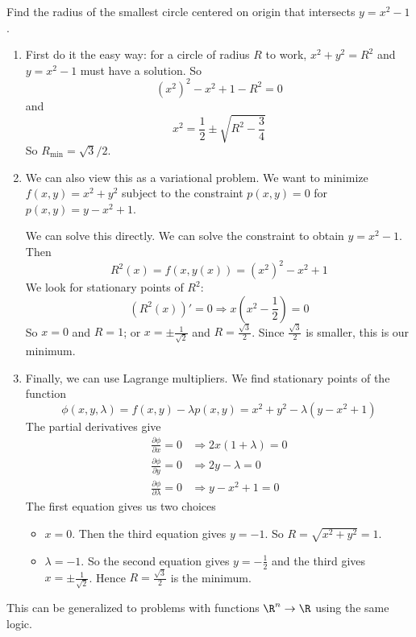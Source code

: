 \documentclass[a4paper]{article}
\begin{document}
\begin{eg}
  Find the radius of the smallest circle centered on origin that intersects $y = x^2 - 1$.

  \begin{enumerate}
    \item First do it the easy way: for a circle of radius $R$ to work, $x^2 + y^2 = R^2$ and $y = x^2 - 1$ must have a solution. So
      \[
        (x^2)^2 - x^2 + 1 - R^2 = 0
      \]
      and
      \[
        x^2 = \frac{1}{2}\pm \sqrt{R^2 - \frac{3}{4}}
      \]
      So $R_{\min} = \sqrt{3}/2$.

    \item We can also view this as a variational problem. We want to minimize $f(x, y) = x^2 + y^2$ subject to the constraint $p(x, y) = 0$ for $p(x, y) = y - x^2 + 1$.

      We can solve this directly. We can solve the constraint to obtain $y = x^2 - 1$. Then
      \[
        R^2(x) = f(x, y(x)) = (x^2)^2 - x^2 + 1
      \]
      We look for stationary points of $R^2$:
      \[
        (R^2(x))' = 0 \Rightarrow x\left(x^2 - \frac{1}{2}\right)= 0
      \]
      So $x = 0$ and $R = 1$; or $x = \pm \frac{1}{\sqrt{2}}$ and $R = \frac{\sqrt{3}}{2}$. Since $\frac{\sqrt{3}}{2}$ is smaller, this is our minimum.

    \item Finally, we can use Lagrange multipliers. We find stationary points of the function
      \[
        \phi(x, y, \lambda) = f(x, y) - \lambda p(x, y) = x^2 + y^2 - \lambda (y - x^2 + 1)
      \]
      The partial derivatives give
      \begin{align*}
        \frac{\partial \phi}{\partial x} = 0 &\Rightarrow 2x(1 + \lambda) = 0\\
        \frac{\partial \phi}{\partial y} = 0 &\Rightarrow 2y - \lambda = 0\\
        \frac{\partial \phi}{\partial \lambda} = 0 &\Rightarrow y - x^2 + 1 = 0
      \end{align*}
      The first equation gives us two choices
      \begin{itemize}
        \item $x = 0$. Then the third equation gives $y = -1$. So $R = \sqrt{x^2 + y^2} = 1$.
        \item $\lambda = -1$. So the second equation gives $y = -\frac{1}{2}$ and the third gives $x = \pm \frac{1}{\sqrt{2}}$. Hence $R = \frac{\sqrt{3}}{2}$ is the minimum.
      \end{itemize}
  \end{enumerate}
\end{eg}
This can be generalized to problems with functions $\R^n \to \R$ using the same logic.
\end{document}
